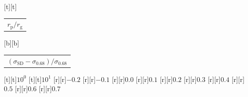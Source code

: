 %    
%
%
\begin{psfrags}%
\psfragscanon%
%
[t][t]{\color[rgb]{0,0,0}\setlength{\tabcolsep}{0pt}\begin{tabular}{c}{\Large$r_\mathrm{p}/r_\mathrm{g}$}\end{tabular}}%
[b][b]{\color[rgb]{0,0,0}\setlength{\tabcolsep}{0pt}\begin{tabular}{c}{\Large$(\sigma_\mathrm{SD}-\sigma_{0.68})/\sigma_{0.68}$}\end{tabular}}%
%
[t][t]{$10^{0}$}%
[t][t]{$10^{1}$}%
%
[r][r]{$-0.2$}%
[r][r]{$-0.1$}%
[r][r]{$0.0$}%
[r][r]{$0.1$}%
[r][r]{$0.2$}%
[r][r]{$0.3$}%
[r][r]{$0.4$}%
[r][r]{$0.5$}%
[r][r]{$0.6$}%
[r][r]{$0.7$}%
%
%
\end{psfrags}%
%
